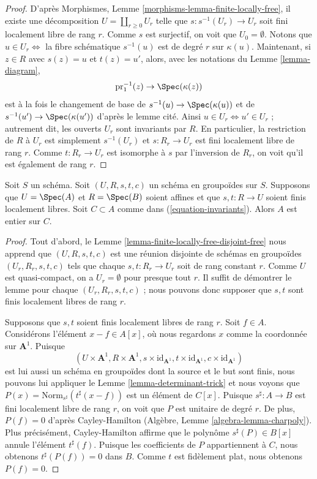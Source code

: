 \begin{proof}
D'après
Morphismes, Lemme \ref{morphisms-lemma-finite-locally-free},
il existe une décomposition
$U = \coprod\nolimits_{r \geq 0} U_r$
telle que $s : s^{-1}(U_r) \to U_r$ soit fini localement libre de rang $r$.
Comme $s$ est surjectif, on voit que $U_0 = \emptyset$.
Notons que $u \in U_r \Leftrightarrow$ la fibre schématique
$s^{-1}(u)$ est de degré $r$ sur $\kappa(u)$. Maintenant, si $z \in R$ avec $s(z) = u$
et $t(z) = u'$, alors, avec les notations du Lemme \ref{lemma-diagram},
$$
\text{pr}_1^{-1}(z) \to \Spec(\kappa(z))
$$
est à la fois le changement de base de
$s^{-1}(u) \to \Spec(\kappa(u))$ et de $s^{-1}(u') \to \Spec(\kappa(u'))$
d'après le lemme cité. Ainsi $u \in U_r \Leftrightarrow u' \in U_r$ ;
autrement dit, les ouverts $U_r$ sont invariants par $R$.
En particulier, la restriction de $R$ à $U_r$ est simplement
$s^{-1}(U_r)$ et $s : R_r \to U_r$ est fini localement libre de rang $r$.
Comme $t : R_r \to U_r$ est isomorphe à $s$ par l'inversion de $R_r$,
on voit qu'il est également de rang $r$.
\end{proof}

\begin{lemma}
\label{lemma-integral-over-invariants}
Soit $S$ un schéma. Soit $(U, R, s, t, c)$ un schéma en groupoïdes sur $S$.
Supposons que $U = \Spec(A)$ et $R = \Spec(B)$ soient affines et que
$s, t : R \to U$ soient finis localement libres.
Soit $C \subset A$ comme dans (\ref{equation-invariants}).
Alors $A$ est entier sur $C$.
\end{lemma}

\begin{proof}
Tout d'abord, le Lemme \ref{lemma-finite-locally-free-disjoint-free}
nous apprend que $(U, R, s, t, c)$ est une réunion disjointe
de schémas en groupoïdes $(U_r, R_r, s, t, c)$ tels que chaque $s, t : R_r \to U_r$
soit de rang constant $r$. Comme $U$ est quasi-compact, on a $U_r = \emptyset$ pour
presque tout $r$. Il suffit de démontrer le lemme pour chaque $(U_r, R_r, s, t, c)$ ;
nous pouvons donc supposer que $s, t$ sont finis localement libres de rang $r$.

\medskip\noindent
Supposons que $s, t$ soient finis localement libres de rang $r$.
Soit $f \in A$. Considérons l'élément $x - f \in A[x]$, où nous regardons
$x$ comme la coordonnée sur $\mathbf{A}^1$.
Puisque
$$
(U \times \mathbf{A}^1, R \times \mathbf{A}^1,
s \times \text{id}_{\mathbf{A}^1},
t \times \text{id}_{\mathbf{A}^1},
c \times \text{id}_{\mathbf{A}^1})
$$
est lui aussi un schéma en groupoïdes dont la source et le but sont finis, nous pouvons lui appliquer
le Lemme \ref{lemma-determinant-trick} et nous voyons que
$P(x) = \text{Norm}_{s^\sharp}(t^\sharp(x - f))$
est un élément de $C[x]$. Puisque $s^\sharp : A \to B$ est fini localement
libre de rang $r$, on voit que $P$ est unitaire de degré $r$.
De plus, $P(f) = 0$ d'après Cayley-Hamilton
(Algèbre, Lemme \ref{algebra-lemma-charpoly}).
Plus précisément, Cayley-Hamilton affirme que le polynôme
$s^\sharp(P) \in B[x]$ annule l'élément $t^\sharp(f)$.
Puisque les coefficients de $P$ appartiennent à $C$, nous obtenons
$t^\sharp(P(f)) = 0$ dans $B$. Comme $t$ est fidèlement plat,
nous obtenons $P(f) = 0$.
\end{proof}

